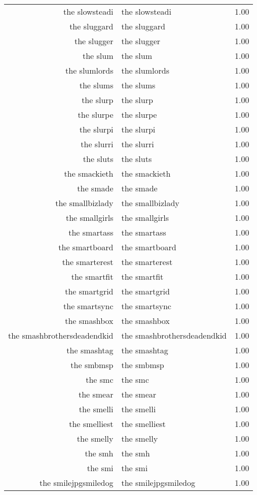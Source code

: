 \begin{table}[ht]
\begin{tabular}{rlr}
  the slowsteadi & the slowsteadi & 1.00 \\ 
  the sluggard & the sluggard & 1.00 \\ 
  the slugger & the slugger & 1.00 \\ 
  the slum & the slum & 1.00 \\ 
  the slumlords & the slumlords & 1.00 \\ 
  the slums & the slums & 1.00 \\ 
  the slurp & the slurp & 1.00 \\ 
  the slurpe & the slurpe & 1.00 \\ 
  the slurpi & the slurpi & 1.00 \\ 
  the slurri & the slurri & 1.00 \\ 
  the sluts & the sluts & 1.00 \\ 
  the smackieth & the smackieth & 1.00 \\ 
  the smade & the smade & 1.00 \\ 
  the smallbizlady & the smallbizlady & 1.00 \\ 
  the smallgirls & the smallgirls & 1.00 \\ 
  the smartass & the smartass & 1.00 \\ 
  the smartboard & the smartboard & 1.00 \\ 
  the smarterest & the smarterest & 1.00 \\ 
  the smartfit & the smartfit & 1.00 \\ 
  the smartgrid & the smartgrid & 1.00 \\ 
  the smartsync & the smartsync & 1.00 \\ 
  the smashbox & the smashbox & 1.00 \\ 
  the smashbrothersdeadendkid & the smashbrothersdeadendkid & 1.00 \\ 
  the smashtag & the smashtag & 1.00 \\ 
  the smbmsp & the smbmsp & 1.00 \\ 
  the smc & the smc & 1.00 \\ 
  the smear & the smear & 1.00 \\ 
  the smelli & the smelli & 1.00 \\ 
  the smelliest & the smelliest & 1.00 \\ 
  the smelly & the smelly & 1.00 \\ 
  the smh & the smh & 1.00 \\ 
  the smi & the smi & 1.00 \\ 
  the smilejpgsmiledog & the smilejpgsmiledog & 1.00 \\ 

\end{tabular}
\end{table}

